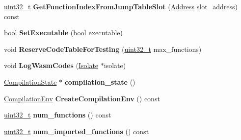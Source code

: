 \begin{DoxyCompactItemize}
\mbox{\hyperlink{classuint32__t}{uint32\+\_\+t}} {\bfseries Get\+Function\+Index\+From\+Jump\+Table\+Slot} (\mbox{\hyperlink{classuintptr__t}{Address}} slot\+\_\+address) const
\item 
\mbox{\label{classv8_1_1internal_1_1wasm_1_1NativeModule_aa484e20639c513d10fdf8ed40e0c20f1}} 
\mbox{\hyperlink{classbool}{bool}} {\bfseries Set\+Executable} (\mbox{\hyperlink{classbool}{bool}} executable)
\item 
\mbox{\label{classv8_1_1internal_1_1wasm_1_1NativeModule_a681d9765150a305cb980bee8c01044a2}} 
void {\bfseries Reserve\+Code\+Table\+For\+Testing} (\mbox{\hyperlink{classuint32__t}{uint32\+\_\+t}} max\+\_\+functions)
\item 
\mbox{\label{classv8_1_1internal_1_1wasm_1_1NativeModule_a1e5b8de55af13bda7ad24dafedeb4a87}} 
void {\bfseries Log\+Wasm\+Codes} (\mbox{\hyperlink{classv8_1_1internal_1_1Isolate}{Isolate}} $\ast$isolate)
\item 
\mbox{\label{classv8_1_1internal_1_1wasm_1_1NativeModule_a12ee394961265deb9fa5849b828da678}} 
\mbox{\hyperlink{classv8_1_1internal_1_1wasm_1_1CompilationState}{Compilation\+State}} $\ast$ {\bfseries compilation\+\_\+state} ()
\item 
\mbox{\label{classv8_1_1internal_1_1wasm_1_1NativeModule_ab3c224bc685b554bd322ece49a6a931c}} 
\mbox{\hyperlink{structv8_1_1internal_1_1wasm_1_1CompilationEnv}{Compilation\+Env}} {\bfseries Create\+Compilation\+Env} () const
\item 
\mbox{\label{classv8_1_1internal_1_1wasm_1_1NativeModule_a4210dcf60ee0c22b95de93af93f17f86}} 
\mbox{\hyperlink{classuint32__t}{uint32\+\_\+t}} {\bfseries num\+\_\+functions} () const
\item 
\mbox{\label{classv8_1_1internal_1_1wasm_1_1NativeModule_af886dc3d493824b7a1ae1e1f5ae02e42}} 
\mbox{\hyperlink{classuint32__t}{uint32\+\_\+t}} {\bfseries num\+\_\+imported\+\_\+functions} () const
\item 

\end{DoxyCompactItemize}
